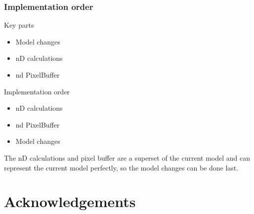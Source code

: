 \documentclass{beamer}
\begin{document}
\begin{frame}
  \frametitle{Implementation order}
  \begin{block}{Key parts}
    \begin{itemize}
    \item Model changes
    \item nD calculations
    \item nd PixelBuffer
    \end{itemize}
  \end{block}
  \begin{block}{Implementation order}
    \begin{itemize}
    \item nD calculations
    \item nd PixelBuffer
    \item Model changes
    \end{itemize}
    The nD calculations and pixel buffer are a superset of the current
    model and can represent the current model perfectly, so the model
    changes can be done last.
  \end{block}
\end{frame}

\appendix

\section[]{Acknowledgements}

\end{document}
